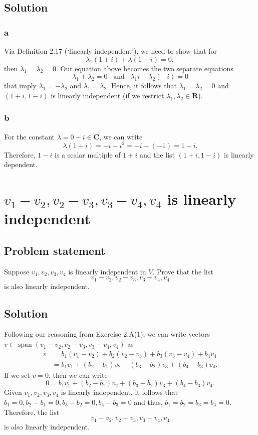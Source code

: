 \documentclass{article}
\begin{document}
\subsection*{Solution}
\subsubsection*{a}
Via Definition 2.17 (`linearly independent'), we need to show that for
\[\lambda_1(1+i)+\lambda(1-i)=0,\]
then $\lambda_1=\lambda_2=0$. 
Our equation above becomes the two separate equations
\[\lambda_1+\lambda_2=0\;\;\;\text{and}\;\;\;\lambda_1i+\lambda_2(-i)=0\]
that imply $\lambda_1=-\lambda_2$ and $\lambda_1=\lambda_2$. 
Hence, it follows that $\lambda_1=\lambda_2=0$ and $(1+i,1-i)$ is linearly independent (if we restrict $\lambda_1,\lambda_2\in\mathbf{R}$).

\subsubsection*{b}
For the constant $\lambda=0-i\in\mathbf{C}$, we can write
\[\lambda(1+i)=-i-i^2=-i-(-1)=1-i.\]
Therefore, $1-i$ is a scalar multiple of $1+i$ and the list $(1+i,1-i)$ is linearly dependent. 

\clearpage

\renewcommand{\thesection}{6}
\section{$v_1-v_2,v_2-v_3,v_3-v_4,v_4$ is linearly independent}
\subsection*{Problem statement}
Suppose $v_1,v_2,v_3,v_4$ is linearly independent in $V$. 
Prove that the list
\[v_1-v_2,v_2-v_3,v_3-v_4,v_4\]
is also linearly independent.

\subsection*{Solution}
Following our reasoning from Exercise 2.A(1), we can write vectors $v\in\operatorname{span}(v_1-v_2,v_2-v_3,v_3-v_4,v_4)$ as
\begin{align*}
    v&=b_1(v_1-v_2)+b_2(v_2-v_3)+b_3(v_3-v_4)+b_4v_4\\
    &=b_1v_1+(b_2-b_1)v_2+(b_3-b_2)v_3+(b_4-b_3)v_4.
\end{align*}
If we set $v=0$, then we can write
\[0=b_1v_1+(b_2-b_1)v_2+(b_3-b_2)v_3+(b_4-b_3)v_4.\]
Given $v_1,v_2,v_3,v_4$ is linearly independent, it follows that\newline $b_1=0,b_2-b_1=0,b_3-b_2=0,b_4-b_3=0$ and thus, $b_1=b_2=b_3=b_4=0$. 
Therefore, the list
\[v_1-v_2,v_2-v_3,v_3-v_4,v_4\]
is also linearly independent.
\end{document}

